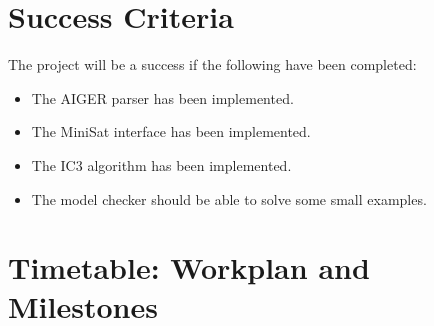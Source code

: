 \documentclass[12pt,a4paper,twoside]{article}
\begin{document}
\section*{Success Criteria}

The project will be a success if the following have been completed:
\begin{itemize}
\item The AIGER parser has been implemented.
\item The MiniSat interface has been implemented.
\item The IC3 algorithm has been implemented.
\item The model checker should be able to solve some small examples.
\end{itemize}


\section*{Timetable: Workplan and Milestones}
\end{document}
